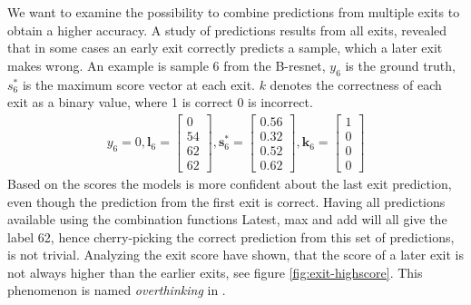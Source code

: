 We want to examine the possibility to combine predictions from multiple exits to obtain a higher accuracy. A study of predictions results from all exits, revealed that in some cases an early exit correctly predicts a sample, which a later exit makes wrong. An example is sample 6 from the B-\gls{resnet}, $ y_6 $ is the ground truth, $ s^*_6 $ is the maximum score vector at each exit. $ k $ denotes the correctness of each exit as a binary value, where 1 is correct 0 is incorrect.
\begin{align*}
y_6=0,
\mathbf{l}_{6}=
\begin{bmatrix}
0 \\
54 \\
62 \\
62
\end{bmatrix},
\mathbf{s}^{*}_{6}=
\begin{bmatrix}
0.56 \\
0.32 \\
0.52 \\
0.62
\end{bmatrix},
\mathbf{k}_{6}=
\begin{bmatrix}
1 \\
0 \\
0 \\
0
\end{bmatrix}
\end{align*}
Based on the scores the models is more confident about the last exit prediction, even though the prediction from the first exit is correct. Having all predictions available using the combination functions Latest, max and add will all give the label 62, hence cherry-picking the correct prediction from this set of predictions, is not trivial. Analyzing the exit score have shown, that the score of a later exit is not always higher than the earlier exits, see figure \ref{fig:exit-highscore}. This phenomenon is named \emph{overthinking} in \cite{kaya_shallow-deep_nodate}.


